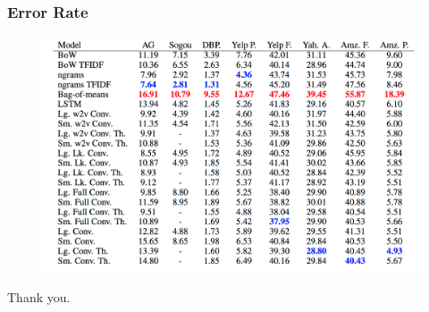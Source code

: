 \documentclass{beamer}
\begin{document}
\begin{frame}
\frametitle{Error Rate}
\begin{figure}
\includegraphics[scale=0.3]{error_rate}
\end{figure}
\end{frame}






\begin{frame}
\center
\huge Thank you.

\end{frame}
\end{document}
